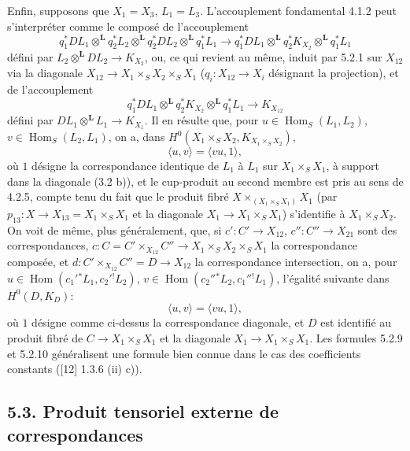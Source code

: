 \documentclass[11pt]{article}
\DeclareMathOperator{\Hom}{Hom}
\providecommand{\Hom}{\operatorname{Hom}}
\begin{document}
Enfin, supposons que $X_1=X_3$, $L_1=L_3$. L'accouplement fondamental 4.1.2 peut s'interpréter comme le composé de l'accouplement
\begin{equation}
\tag{5.2.7}
q_1^*DL_1\otimes^{\mathbf L}q_2^*L_2\otimes^{\mathbf L}q_2^*DL_2\otimes^{\mathbf L}q_1^*L_1
\longrightarrow
q_1^*DL_1\otimes^{\mathbf L}q_2^*K_{X_2}\otimes^{\mathbf L}q_1^*L_1
\end{equation}
défini par $L_2\otimes^{\mathbf L}DL_2\to K_{X_2}$, ou, ce qui revient au même, induit par 5.2.1 sur $X_{12}$ via la diagonale $X_{12}\to X_1\times_SX_2\times_SX_1$ ($q_i:X_{12}\to X_i$ désignant la projection), et de l'accouplement
\begin{equation}
\tag{5.2.8}
q_1^*DL_1\otimes^{\mathbf L}q_2^*K_{X_2}\otimes^{\mathbf L}q_1^*L_1\longrightarrow K_{X_{12}}
\end{equation}
défini par $DL_1\otimes^{\mathbf L}L_1\to K_{X_1}$. Il en résulte que, pour $u\in\Hom_S(L_1,L_2)$, $v\in\Hom_S(L_2,L_1)$, on a, dans $H^0(X_1\times_SX_2,K_{X_1\times_SX_2})$,
\begin{equation}
\tag{5.2.9}
\langle u,v\rangle=\langle vu,1\rangle,
\end{equation}
où $1$ désigne la correspondance identique de $L_1$ à $L_1$ sur $X_1\times_SX_1$, à support dans la diagonale (3.2 b)), et le cup-produit au second membre est pris au sens de 4.2.5, compte tenu du fait que le produit fibré $X\times_{(X_1\times_SX_1)}X_1$ (par $p_{13}:X\to X_{13}=X_1\times_SX_1$ et la diagonale $X_1\to X_1\times_SX_1$) s'identifie à $X_1\times_SX_2$. On voit de même, plus généralement, que, si $c':C'\to X_{12}$, $c'':C''\to X_{21}$ sont des correspondances, $c:C=C'\times_{X_{12}}C''\to X_1\times_SX_2\times_SX_1$ la correspondance composée, et $d:C'\times_{X_{12}}C''=D\to X_{12}$ la correspondance intersection, on a, pour $u\in\Hom(c_1'{}^*L_1,c_2'{}^!L_2)$, $v\in\Hom(c_2''{}^*L_2,c_1''{}^!L_1)$, l'égalité suivante dans $H^0(D,K_D)$:
\begin{equation}
\tag{5.2.10}
\langle u,v\rangle=\langle vu,1\rangle,
\end{equation}
où $1$ désigne comme ci-dessus la correspondance diagonale, et $D$ est identifié au produit fibré de $C\to X_1\times_SX_1$ et la diagonale $X_1\to X_1\times_SX_1$. Les formules 5.2.9 et 5.2.10 généralisent une formule bien connue dans le cas des coefficients constants ([12] 1.3.6 (ii) c)).

\subsection*{5.3. Produit tensoriel externe de correspondances}
\end{document}
